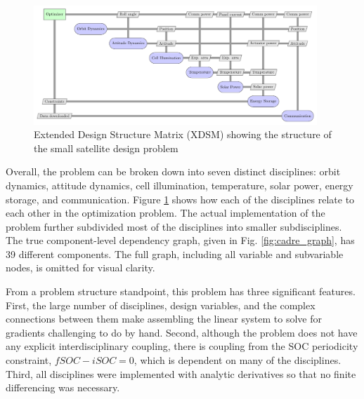 \documentclass[]{aiaa-tc} %
\begin{document}
    \begin{figure}[!htbp]
        \centering
        \includegraphics[width=0.95\textwidth]{xdsm/cadre_xdsm}
        \caption{Extended Design Structure Matrix (XDSM) showing the structure of the small satellite design problem}
        \label{fig:cadre_xdsm}
    \end{figure}

    Overall, the problem can be broken down into seven distinct disciplines: orbit dynamics, attitude dynamics, cell illumination,
    temperature, solar power, energy storage, and communication. Figure \ref{fig:cadre_xdsm} shows how each of the disciplines
    relate to each other in the optimization problem. The actual implementation of the problem further
    subdivided most of the disciplines into smaller subdisciplines. The true component-level dependency
    graph, given in Fig. \ref{fig:cadre_graph}, has 39 different components. The full graph, including all variable and
    subvariable nodes, is omitted for visual clarity.

    From a problem structure standpoint, this problem has three significant features. First, the large number of
    disciplines, design variables, and the complex connections between them make assembling the linear system to solve for gradients
    challenging to do by hand. Second, although the problem does not have any explicit interdisciplinary coupling,
    there is coupling from the SOC periodicity constraint, $fSOC - iSOC = 0$, which is dependent on many of the
    disciplines. Third, all disciplines were implemented with analytic derivatives so that no finite differencing was
    necessary.
\end{document}
